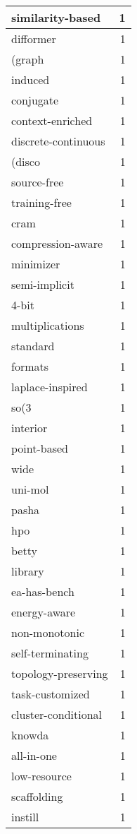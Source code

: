 \begin{table}[h]
\begin{tabular}{|l|r|}
\hline
similarity-based & 1 \\
\hline
difformer & 1 \\
\hline
(graph & 1 \\
\hline
induced & 1 \\
\hline
conjugate & 1 \\
\hline
context-enriched & 1 \\
\hline
discrete-continuous & 1 \\
\hline
(disco & 1 \\
\hline
source-free & 1 \\
\hline
training-free & 1 \\
\hline
cram & 1 \\
\hline
compression-aware & 1 \\
\hline
minimizer & 1 \\
\hline
semi-implicit & 1 \\
\hline
4-bit & 1 \\
\hline
multiplications & 1 \\
\hline
standard & 1 \\
\hline
formats & 1 \\
\hline
laplace-inspired & 1 \\
\hline
so(3 & 1 \\
\hline
interior & 1 \\
\hline
point-based & 1 \\
\hline
wide & 1 \\
\hline
uni-mol & 1 \\
\hline
pasha & 1 \\
\hline
hpo & 1 \\
\hline
betty & 1 \\
\hline
library & 1 \\
\hline
ea-has-bench & 1 \\
\hline
energy-aware & 1 \\
\hline
non-monotonic & 1 \\
\hline
self-terminating & 1 \\
\hline
topology-preserving & 1 \\
\hline
task-customized & 1 \\
\hline
cluster-conditional & 1 \\
\hline
knowda & 1 \\
\hline
all-in-one & 1 \\
\hline
low-resource & 1 \\
\hline
scaffolding & 1 \\
\hline
instill & 1 \\

\end{tabular}
\end{table}
